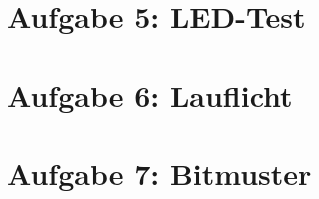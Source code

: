 \documentclass[parskip=full]{scrartcl}
\begin{document}
	\section*{Aufgabe 5: LED-Test}
	\section*{Aufgabe 6: Lauflicht}
	\section*{Aufgabe 7: Bitmuster}
	
	
\end{document}
